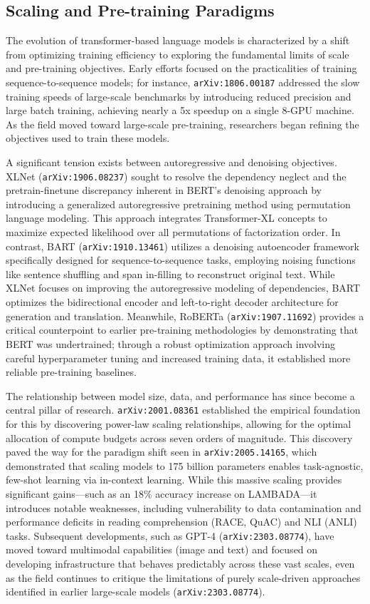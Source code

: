 \documentclass[11pt]{article}
\begin{document}
\subsection{Scaling and Pre-training Paradigms}

The evolution of transformer-based language models is characterized by a shift from optimizing training efficiency to exploring the fundamental limits of scale and pre-training objectives. Early efforts focused on the practicalities of training sequence-to-sequence models; for instance, \texttt{arXiv:1806.00187} addressed the slow training speeds of large-scale benchmarks by introducing reduced precision and large batch training, achieving nearly a 5x speedup on a single 8-GPU machine. As the field moved toward large-scale pre-training, researchers began refining the objectives used to train these models.

A significant tension exists between autoregressive and denoising objectives. XLNet (\texttt{arXiv:1906.08237}) sought to resolve the dependency neglect and the pretrain-finetune discrepancy inherent in BERT's denoising approach by introducing a generalized autoregressive pretraining method using permutation language modeling. This approach integrates Transformer-XL concepts to maximize expected likelihood over all permutations of factorization order. In contrast, BART (\texttt{arXiv:1910.13461}) utilizes a denoising autoencoder framework specifically designed for sequence-to-sequence tasks, employing noising functions like sentence shuffling and span in-filling to reconstruct original text. While XLNet focuses on improving the autoregressive modeling of dependencies, BART optimizes the bidirectional encoder and left-to-right decoder architecture for generation and translation. Meanwhile, RoBERTa (\texttt{arXiv:1907.11692}) provides a critical counterpoint to earlier pre-training methodologies by demonstrating that BERT was undertrained; through a robust optimization approach involving careful hyperparameter tuning and increased training data, it established more reliable pre-training baselines.

The relationship between model size, data, and performance has since become a central pillar of research. \texttt{arXiv:2001.08361} established the empirical foundation for this by discovering power-law scaling relationships, allowing for the optimal allocation of compute budgets across seven orders of magnitude. This discovery paved the way for the paradigm shift seen in \texttt{arXiv:2005.14165}, which demonstrated that scaling models to 175 billion parameters enables task-agnostic, few-shot learning via in-context learning. While this massive scaling provides significant gains—such as an 18\% accuracy increase on LAMBADA—it introduces notable weaknesses, including vulnerability to data contamination and performance deficits in reading comprehension (RACE, QuAC) and NLI (ANLI) tasks. Subsequent developments, such as GPT-4 (\texttt{arXiv:2303.08774}), have moved toward multimodal capabilities (image and text) and focused on developing infrastructure that behaves predictably across these vast scales, even as the field continues to critique the limitations of purely scale-driven approaches identified in earlier large-scale models (\texttt{arXiv:2303.08774}).
\end{document}
